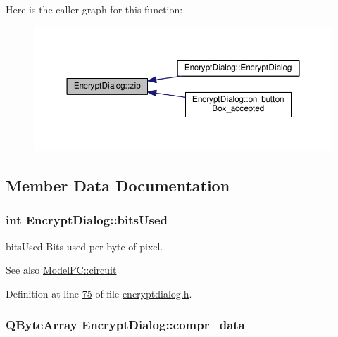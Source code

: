 Here is the caller graph for this function\+:
\nopagebreak
\begin{figure}[H]
\begin{center}
\leavevmode
\includegraphics[width=350pt]{class_encrypt_dialog_a2bff820a3df4ddc36ecb07ed74b7138a_icgraph}
\end{center}
\end{figure}




\subsection{Member Data Documentation}
\subsubsection[{\texorpdfstring{bits\+Used}{bitsUsed}}]{\setlength{\rightskip}{0pt plus 5cm}int Encrypt\+Dialog\+::bits\+Used}\hypertarget{class_encrypt_dialog_abf638fea37fbdbaba215954e2e239860}{}\label{class_encrypt_dialog_abf638fea37fbdbaba215954e2e239860}


bits\+Used Bits used per byte of pixel. 

\begin{DoxySeeAlso}{See also}
\hyperlink{class_model_p_c_a1d0091062a0c836b283ec2f67411623b}{Model\+P\+C\+::circuit} 
\end{DoxySeeAlso}


Definition at line \hyperlink{encryptdialog_8h_source_l00075}{75} of file \hyperlink{encryptdialog_8h_source}{encryptdialog.\+h}.

\subsubsection[{\texorpdfstring{compr\+\_\+data}{compr_data}}]{\setlength{\rightskip}{0pt plus 5cm}Q\+Byte\+Array Encrypt\+Dialog\+::compr\+\_\+data}\hypertarget{class_encrypt_dialog_a3e8998aa39696cbd1242f6420ef18143}{}\label{class_encrypt_dialog_a3e8998aa39696cbd1242f6420ef18143}


